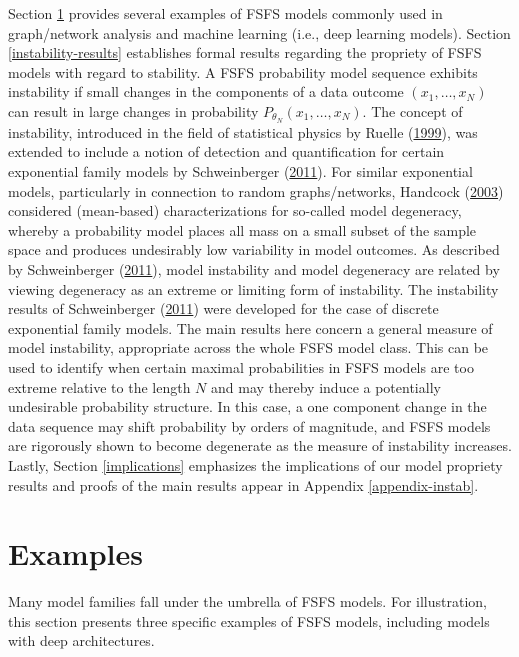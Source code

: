 \documentclass[12pt]{article}
\theoremstyle{definition}
\begin{document}
Section \ref{examples} provides several examples of FSFS models commonly
used in graph/network analysis and machine learning (i.e., deep learning
models). Section \ref{instability-results} establishes formal results
regarding the propriety of FSFS models with regard to stability. A FSFS
probability model sequence exhibits instability if small changes in the
components of a data outcome \((x_1,\ldots,x_N)\) can result in large
changes in probability \(P_{\theta_N}(x_1,\ldots,x_N)\). The concept of
instability, introduced in the field of statistical physics by Ruelle
(\protect\hyperlink{ref-ruelle1999statistical}{1999}), was extended to
include a notion of detection and quantification for certain exponential
family models by Schweinberger
(\protect\hyperlink{ref-schweinberger2011instability}{2011}). For
similar exponential models, particularly in connection to random
graphs/networks, Handcock
(\protect\hyperlink{ref-handcock2003assessing}{2003}) considered
(mean-based) characterizations for so-called model degeneracy, whereby a
probability model places all mass on a small subset of the sample space
and produces undesirably low variability in model outcomes. As described
by Schweinberger
(\protect\hyperlink{ref-schweinberger2011instability}{2011}), model
instability and model degeneracy are related by viewing degeneracy as an
extreme or limiting form of instability. The instability results of
Schweinberger
(\protect\hyperlink{ref-schweinberger2011instability}{2011}) were
developed for the case of discrete exponential family models. The main
results here concern a general measure of model instability, appropriate
across the whole FSFS model class. This can be used to identify when
certain maximal probabilities in FSFS models are too extreme relative to
the length \(N\) and may thereby induce a potentially undesirable
probability structure. In this case, a one component change in the data
sequence may shift probability by orders of magnitude, and FSFS models
are rigorously shown to become degenerate as the measure of instability
increases. Lastly, Section \ref{implications} emphasizes the
implications of our model propriety results and proofs of the main
results appear in Appendix \ref{appendix-instab}.

\section{Examples}\label{examples}

Many model families fall under the umbrella of FSFS models. For
illustration, this section presents three specific examples of FSFS
models, including models with deep architectures.
\end{document}

